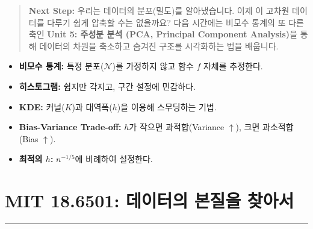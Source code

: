\documentclass[11pt,a4paper]{book}
\theoremstyle{definition}
\begin{document}
\vspace{1cm}
\begin{quote}
\textbf{Next Step:} 우리는 데이터의 분포(밀도)를 알아냈습니다. 이제 이 고차원 데이터를 다루기 쉽게 압축할 수는 없을까요? 다음 시간에는 비모수 통계의 또 다른 축인 \textbf{Unit 5: 주성분 분석 (PCA, Principal Component Analysis)}을 통해 데이터의 차원을 축소하고 숨겨진 구조를 시각화하는 법을 배웁니다.
\end{quote}

\begin{summarybox}[title={Unit 4 핵심 요약}]
\begin{itemize}
    \item \textbf{비모수 통계:} 특정 분포($\mathcal{N}$)를 가정하지 않고 함수 $f$ 자체를 추정한다.
    \item \textbf{히스토그램:} 쉽지만 각지고, 구간 설정에 민감하다.
    \item \textbf{KDE:} 커널($K$)과 대역폭($h$)을 이용해 스무딩하는 기법.
    \item \textbf{Bias-Variance Trade-off:} $h$가 작으면 과적합(Variance $\uparrow$), 크면 과소적합(Bias $\uparrow$).
    \item \textbf{최적의 $h$:} $n^{-1/5}$에 비례하여 설정한다.
\end{itemize}
\end{summarybox}


\chapter{MIT 18.6501: 데이터의 본질을 찾아서}
\label{ch:lecture11}


\vspace{1cm}
\hrule
\vspace{1cm}
\end{document}
